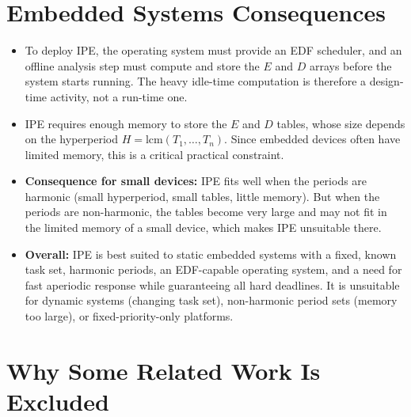 \documentclass[conference]{IEEEtran}
\begin{document}
\section{Embedded Systems Consequences}

\begin{itemize}
  \item To deploy IPE, the operating system must provide an EDF scheduler, and
        an offline analysis step must compute and store the $E$ and $D$ arrays
        before the system starts running. The heavy idle-time computation is
        therefore a design-time activity, not a run-time one.
  \item IPE requires enough memory to store the $E$ and $D$ tables, whose size
        depends on the hyperperiod $H = \mathrm{lcm}(T_1,\dots,T_n)$. Since
        embedded devices often have limited memory, this is a critical
        practical constraint.
  \item \textbf{Consequence for small devices:} IPE fits well when the periods
        are harmonic (small hyperperiod, small tables, little memory). But when
        the periods are non-harmonic, the tables become very large and may not
        fit in the limited memory of a small device, which makes IPE unsuitable
        there.
  \item \textbf{Overall:} IPE is best suited to static embedded systems with a
        fixed, known task set, harmonic periods, an EDF-capable operating
        system, and a need for fast aperiodic response while guaranteeing all
        hard deadlines. It is unsuitable for dynamic systems (changing task
        set), non-harmonic period sets (memory too large), or
        fixed-priority-only platforms.
\end{itemize}

\section{Why Some Related Work Is Excluded}
\end{document}
